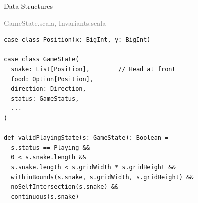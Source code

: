 \documentclass{beamer}
\begin{document}
\begin{frame}[fragile]{Data Structures}
\begin{flushright}
\tiny\textcolor{gray}{GameState.scala, Invariants.scala}
\end{flushright}
\vspace{-0.5cm}
\begin{lstlisting}[style=scala]
case class Position(x: BigInt, y: BigInt)

case class GameState(
  snake: List[Position],        // Head at front
  food: Option[Position],
  direction: Direction,
  status: GameStatus,
  ...
)

def validPlayingState(s: GameState): Boolean =
  s.status == Playing &&
  0 < s.snake.length && 
  s.snake.length < s.gridWidth * s.gridHeight &&
  withinBounds(s.snake, s.gridWidth, s.gridHeight) &&
  noSelfIntersection(s.snake) &&
  continuous(s.snake)
\end{lstlisting}
\end{frame}
\end{document}
